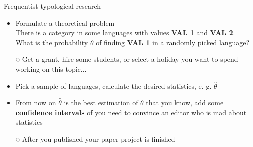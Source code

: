 \documentclass[13pt, t]{beamer}
\begin{document}
\begin{frame}{Frequentist typological research}
\begin{itemize}
\item Formulate a theoretical problem\\ %
There is a category in some languages with values \textbf{VAL 1} and \textbf{VAL 2}. \pause \\
What is the probability $\theta$ of finding \textbf{VAL 1} in a randomly picked language? \pause
\item[◌] Get a grant, hire some students, or select a holiday you want to spend working on this topic... \pause
\item Pick a sample of languages, calculate the desired statistics, e. g. $\hat{\theta}$ \pause
\item From now on $\hat{\theta}$ is the best estimation of $\theta$ that you know\pause, add some \textbf{confidence intervals} of you need to convince an editor who is mad about statistics
\item[◌] After you published your paper project is finished
\end{itemize}
\end{frame}
\end{document}

